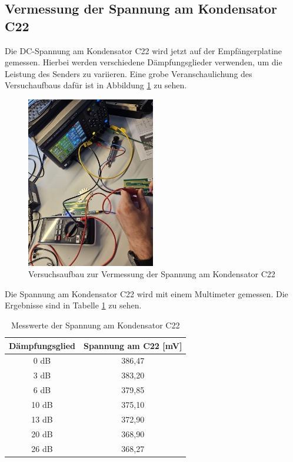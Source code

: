 \subsection{Vermessung der Spannung am Kondensator C22}
Die DC-Spannung am Kondensator C22 wird jetzt auf der Empfängerplatine gemessen. Hierbei werden verschiedene Dämpfungsglieder verwenden, um die Leistung des Senders zu variieren. Eine grobe Veranschaulichung des Versuchaufbaus dafür ist in Abbildung \ref{fig:versuchsaufbau2} zu sehen.
\begin{figure}[H]
    \centering
    \includegraphics[width=0.5\textwidth]{Pictures/VesuchsaufbauSpannung.jpg}
    \caption{Versuchsaufbau zur Vermessung der Spannung am Kondensator C22}
    \label{fig:versuchsaufbau2}
\end{figure}
Die Spannung am Kondensator C22 wird mit einem Multimeter gemessen. Die Ergebnisse sind in Tabelle \ref{tab:spannung} zu sehen.
\begin{table}[H]
    \centering
    \caption{Messwerte der Spannung am Kondensator C22}
    \begin{tabular}{|c|c|}
        \hline
        Dämpfungsglied & Spannung am C22 [mV] \\ \hline
        0 dB            & 386,47                 \\ \hline
        3 dB            & 383,20                 \\ \hline
        6 dB            & 379,85                 \\ \hline
        10 dB           & 375,10                 \\ \hline
        13 dB           & 372,90                 \\ \hline
        20 dB           & 368,90                 \\ \hline
        26 dB           & 368,27                 \\ \hline
    \end{tabular}
    \label{tab:spannung}
\end{table}

